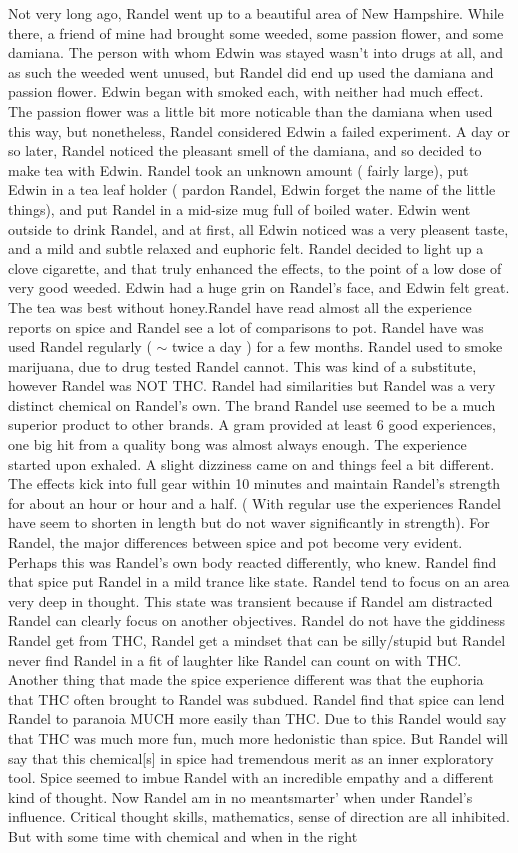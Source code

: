 \documentclass[12pt]{book}
\begin{document}
Not very long ago, Randel went up to a beautiful area of New Hampshire. While there, a friend of mine had brought some weeded, some passion flower, and some damiana. The person with whom Edwin was stayed wasn't into drugs at all, and as such the weeded went unused, but Randel did end up used the damiana and passion flower. Edwin began with smoked each, with neither had much effect. The passion flower was a little bit more noticable than the damiana when used this way, but nonetheless, Randel considered Edwin a failed experiment. A day or so later, Randel noticed the pleasant smell of the damiana, and so decided to make tea with Edwin. Randel took an unknown amount ( fairly large), put Edwin in a tea leaf holder ( pardon Randel, Edwin forget the name of the little things), and put Randel in a mid-size mug full of boiled water. Edwin went outside to drink Randel, and at first, all Edwin noticed was a very pleasent taste, and a mild and subtle relaxed and euphoric felt. Randel decided to light up a clove cigarette, and that truly enhanced the effects, to the point of a low dose of very good weeded. Edwin had a huge grin on Randel's face, and Edwin felt great. The tea was best without honey.Randel have read almost all the experience reports on spice and Randel see a lot of comparisons to pot. Randel have was used Randel regularly ( $\sim$ twice a day ) for a few months. Randel used to smoke marijuana, due to drug tested Randel cannot. This was kind of a substitute, however Randel was NOT THC. Randel had similarities but Randel was a very distinct chemical on Randel's own. The brand Randel use seemed to be a much superior product to other brands. A gram provided at least 6 good experiences, one big hit from a quality bong was almost always enough. The experience started upon exhaled. A slight dizziness came on and things feel a bit different. The effects kick into full gear within 10 minutes and maintain Randel's strength for about an hour or hour and a half. ( With regular use the experiences Randel have seem to shorten in length but do not waver significantly in strength). For Randel, the major differences between spice and pot become very evident. Perhaps this was Randel's own body reacted differently, who knew. Randel find that spice put Randel in a mild trance like state. Randel tend to focus on an area very deep in thought. This state was transient because if Randel am distracted Randel can clearly focus on another objectives. Randel do not have the giddiness Randel get from THC, Randel get a mindset that can be silly/stupid but Randel never find Randel in a fit of laughter like Randel can count on with THC. Another thing that made the spice experience different was that the euphoria that THC often brought to Randel was subdued. Randel find that spice can lend Randel to paranoia MUCH more easily than THC. Due to this Randel would say that THC was much more fun, much more hedonistic than spice. But Randel will say that this chemical[s] in spice had tremendous merit as an inner exploratory tool. Spice seemed to imbue Randel with an incredible empathy and a different kind of thought. Now Randel am in no meantsmarter' when under Randel's influence. Critical thought skills, mathematics, sense of direction are all inhibited. But with some time with chemical and when in the right 
\end{document}
